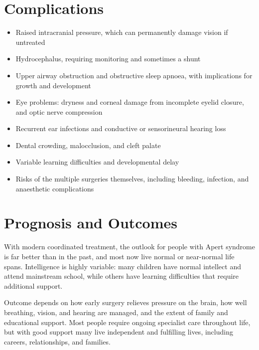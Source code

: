 \section*{Complications}
\begin{itemize}
    \item Raised intracranial pressure, which can permanently damage vision if untreated
    \item Hydrocephalus, requiring monitoring and sometimes a shunt
    \item Upper airway obstruction and obstructive sleep apnoea, with implications for growth and development
    \item Eye problems: dryness and corneal damage from incomplete eyelid closure, and optic nerve compression
    \item Recurrent ear infections and conductive or sensorineural hearing loss
    \item Dental crowding, malocclusion, and cleft palate
    \item Variable learning difficulties and developmental delay
    \item Risks of the multiple surgeries themselves, including bleeding, infection, and anaesthetic complications
\end{itemize}

\section*{Prognosis and Outcomes}
With modern coordinated treatment, the outlook for people with Apert syndrome is far better than in the past, and most now live normal or near-normal life spans. Intelligence is highly variable: many children have normal intellect and attend mainstream school, while others have learning difficulties that require additional support.

Outcome depends on how early surgery relieves pressure on the brain, how well breathing, vision, and hearing are managed, and the extent of family and educational support. Most people require ongoing specialist care throughout life, but with good support many live independent and fulfilling lives, including careers, relationships, and families.

